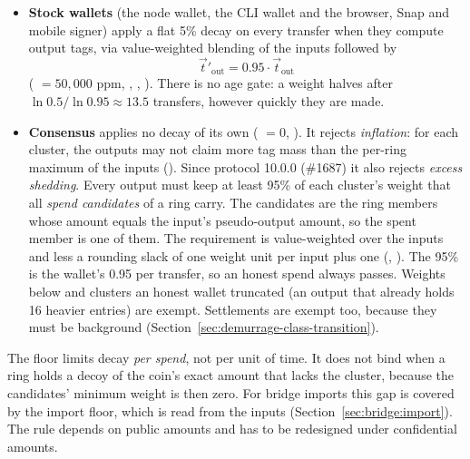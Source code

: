 \begin{itemize}
  \item \textbf{Stock wallets} (the node wallet, the CLI wallet and the
    browser, Snap and mobile signer) apply a flat 5\% decay on every transfer
    when they compute output tags, via value-weighted blending of the inputs
    followed by
    \begin{equation}
    \vec{t}'_{\text{out}} = 0.95 \cdot \vec{t}_{\text{out}}
    \end{equation}
    ( $= 50{,}000$ ppm,
    ,
    ,
    ). There is no age gate: a
    weight halves after $\ln 0.5 / \ln 0.95 \approx 13.5$ transfers, however
    quickly they are made.
  \item \textbf{Consensus} applies no decay of its own
    ( $= 0$,
    ). It rejects \emph{inflation}: for each
    cluster, the outputs may not claim more tag mass than the per-ring maximum
    of the inputs (). Since protocol
    10.0.0 (\#1687) it also rejects \emph{excess shedding}. Every output must
    keep at least 95\% of each cluster's weight that all \emph{spend
    candidates} of a ring carry. The candidates are the ring members whose
    amount equals the input's pseudo-output amount, so the spent member is
    one of them. The requirement is value-weighted over the inputs and less a
    rounding slack of one weight unit per input plus one
    (,
    ). The 95\% is the wallet's 0.95
    per transfer, so an honest spend always passes. Weights below
     and clusters an honest wallet truncated (an
    output that already holds 16 heavier entries) are exempt. Settlements are
    exempt too, because they must be background
    (Section~\ref{sec:demurrage-class-transition}).
\end{itemize}

The floor limits decay \emph{per spend}, not per unit of time. It does not
bind when a ring holds a decoy of the coin's exact amount that lacks the
cluster, because the candidates' minimum weight is then zero. For bridge
imports this gap is covered by the import floor, which is read from the
inputs (Section~\ref{sec:bridge:import}). The rule depends on public
amounts and has to be redesigned under confidential amounts.

